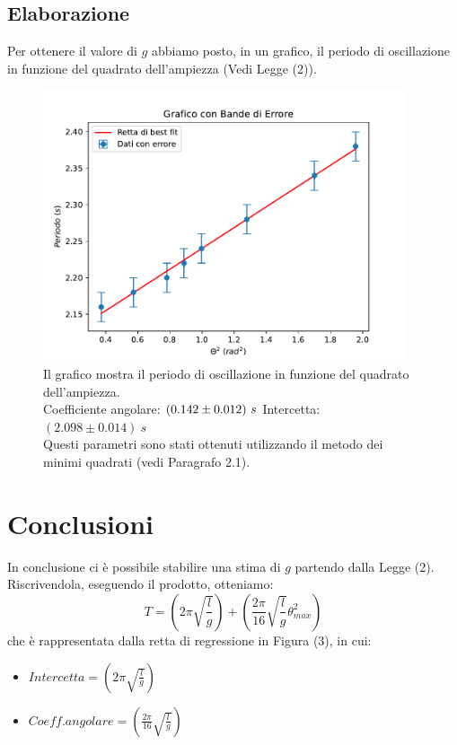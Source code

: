 \documentclass[11pt]{article}
\begin{document}
\subsection{Elaborazione}
Per ottenere il valore di $g$ abbiamo posto, in un grafico, il periodo di oscillazione in funzione del quadrato dell'ampiezza (Vedi Legge (2)).
\begin{figure}[H]
  \centering
  \includegraphics[width=0.95\textwidth]{grafico1.pdf}
  \caption{Il grafico mostra il periodo di oscillazione in funzione del quadrato dell'ampiezza. \\
  Coefficiente angolare: $(0.142\pm 0.012)\ s\\$
  Intercetta: $(2.098\pm 0.014)\ s$\\
  Questi parametri sono stati ottenuti utilizzando il metodo dei minimi quadrati (vedi Paragrafo 2.1).}
\end{figure}

\section{Conclusioni}
In conclusione ci è possibile stabilire una stima di $g$ partendo dalla Legge (2). Riscrivendola, eseguendo il prodotto, otteniamo:
\begin{equation}
    T=\left(2\pi\sqrt{\frac{l}{g}}\right)+\left(\frac{2\pi}{16}\sqrt{\frac{l}{g}}\theta_{max}^2\right)
\end{equation}
che è rappresentata dalla retta di regressione in Figura (3), in cui:
\begin{itemize}
    \item $Intercetta = \left(2\pi\sqrt{\frac{l}{g}}\right)$
    \item $Coeff. angolare= \left(\frac{2\pi}{16}\sqrt{\frac{l}{g}}\right)$
\end{itemize}
\end{document}
